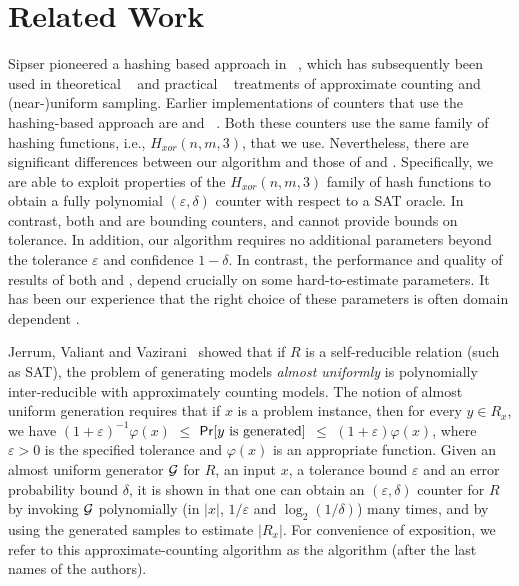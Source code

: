 \section{Related Work}\label{sec:relatedwork}


Sipser pioneered a hashing based approach in ~\cite{Sipser83}, which
has subsequently been used in theoretical
~\cite{trevisan2002lecture,Bellare98uniformgeneration} and practical
~\cite{Gomes-Sampling,gomes2006model,SKV13} treatments of approximate counting and
(near-)uniform sampling.
%
%
%
%
Earlier implementations of counters that use the hashing-based
approach are {\MBound} and {\HybridMBound}~\cite{gomes2006model}.
Both these counters use the same family of hashing functions, i.e.,
$H_{xor}(n, m, 3)$, that we use.  Nevertheless, there are significant
differences between our algorithm and those of {\MBound} and
{\HybridMBound}.  Specifically, we are able to exploit properties of
the $H_{xor}(n, m, 3)$ family of hash functions to obtain a fully
polynomial $(\varepsilon, \delta)$ counter with respect to a SAT
oracle.  In contrast, both {\MBound} and {\HybridMBound} are bounding
counters, and cannot provide bounds on tolerance.  In addition, our
algorithm requires no additional parameters beyond the tolerance
$\varepsilon$ and confidence $1-\delta$.  In contrast, the performance
and quality of results of both {\MBound} and {\HybridMBound}, depend
crucially on some hard-to-estimate parameters.  It has been our
experience that the right choice of these parameters is often domain
dependent .

Jerrum, Valiant and Vazirani~\cite{Jerr} showed that if $R$ is a 
self-reducible  relation (such as SAT),
%
%
the problem of generating models \emph{almost uniformly} is 
polynomially inter-reducible with approximately counting models.  The 
notion of almost uniform generation requires that if $x$ 
is a problem instance, then for every $y \in R_x$, we have $(1
+ \varepsilon)^{-1}\varphi(x)$ $\le$ $\mathsf{Pr}[y \mbox{ is generated}]$
$\le$ $(1 + \varepsilon)\varphi(x)$, where 
$\varepsilon > 0$ is the specified tolerance and $\varphi(x)$ is an
appropriate function. Given an almost 
uniform generator $\mathcal{G}$ for $R$, an input $x$, a tolerance bound
$\varepsilon$ and an error probability bound $\delta$, it is shown
in \cite{Jerr} that one can obtain an $(\varepsilon, \delta)$
counter for $R$ by invoking $\mathcal{G}$ polynomially (in $|x|$,
$1/\varepsilon$ and $\log_2(1/\delta)$) many times, and by using the
generated samples to estimate $|R_x|$.  For convenience of exposition,
we refer to this approximate-counting algorithm as the {\JVV}
algorithm (after the last names of the authors).

